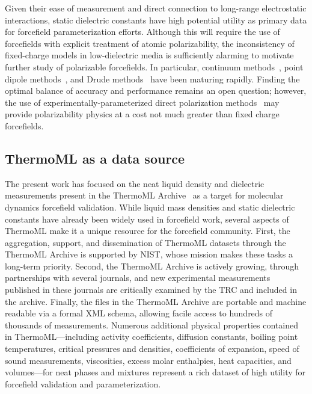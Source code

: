 \documentclass[aps,pre,twocolumn,nofootinbib,superscriptaddress,linenumbers]{revtex4-1}
\begin{document}
Given their ease of measurement and direct connection to long-range electrostatic interactions, static dielectric constants have high potential utility as primary data for forcefield parameterization efforts.  
Although this will require the use of forcefields with explicit treatment of atomic polarizability, the inconsistency of fixed-charge models in low-dielectric media is sufficiently alarming to motivate further study of polarizable forcefields.  In particular, continuum methods~\cite{truchon2010using, truchon2009integrated, truchon2008accurate}, point dipole methods~\cite{Ponder2010, ren2004temperature}, and Drude methods~\cite{lamoureux2003modeling, anisimov2005determination} have been maturing rapidly.  Finding the optimal balance of accuracy and performance remains an open question; however, the use of experimentally-parameterized direct polarization methods~\cite{wang2013systematic} may provide polarizability physics at a cost not much greater than fixed charge forcefields.


\subsection{ThermoML as a data source}

The present work has focused on the neat liquid density and dielectric measurements present in the ThermoML Archive~\cite{frenkel2006xml, frenkel2003thermoml, chirico2003thermoml} as a target for molecular dynamics forcefield validation.  
While liquid mass densities and static dielectric constants have already been widely used in forcefield work, several aspects of ThermoML make it a unique resource for the forcefield community.  
First, the aggregation, support, and dissemination of ThermoML datasets through the ThermoML Archive is supported by NIST, whose mission makes these tasks a long-term priority.  
Second, the ThermoML Archive is actively growing, through partnerships with several journals, and new experimental measurements published in these journals are critically examined by the TRC and included in the archive.  
Finally, the files in the ThermoML Archive are portable and machine readable via a formal XML schema, allowing facile access to hundreds of thousands of measurements.  
Numerous additional physical properties contained in ThermoML---including activity coefficients, diffusion constants, boiling point temperatures, critical pressures and densities, coefficients of expansion, speed of sound measurements, viscosities, excess molar enthalpies, heat capacities, and volumes---for neat phases and mixtures represent a rich dataset of high utility for forcefield validation and parameterization.
\end{document}
